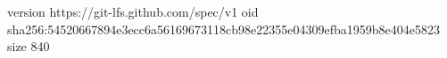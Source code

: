 version https://git-lfs.github.com/spec/v1
oid sha256:54520667894e3ecc6a56169673118cb98e22355e04309efba1959b8e404e5823
size 840
